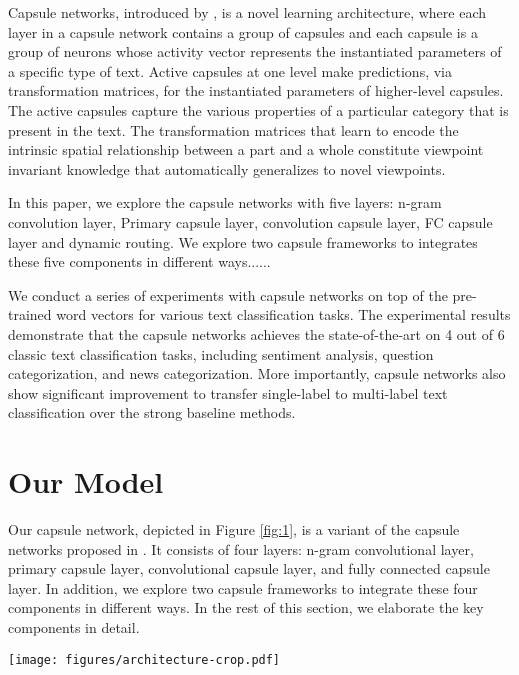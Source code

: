 \documentclass[11pt]{article}
\begin{document}
Capsule networks, introduced by \citet{hinton2011transforming,sabour2017dynamic}, is a novel learning architecture, where each layer in a capsule network contains a group of capsules and each capsule is a group of neurons whose activity vector represents the instantiated parameters of a specific type of text. Active capsules at one level make predictions, via transformation matrices, for the instantiated parameters of higher-level capsules. The active capsules capture the various properties of a particular category that is present in the text. 
The transformation matrices that learn to encode the intrinsic spatial relationship between a part and a whole constitute
viewpoint invariant knowledge that automatically generalizes to novel viewpoints.

In this paper, we explore the capsule networks with five layers:  n-gram convolution layer, Primary capsule layer, convolution capsule layer, FC capsule layer and dynamic routing.
We explore two capsule frameworks to integrates these five components in different ways......


We conduct a series of experiments with capsule networks on top of the pre-trained word vectors for various text classification tasks. 
The experimental results demonstrate that the capsule networks achieves the state-of-the-art on 4 out of 6 classic text classification tasks, including sentiment analysis, question categorization, and news categorization. 
More importantly, capsule networks also show significant improvement to transfer single-label to multi-label text classification over the strong baseline methods. 
\fi
 



\section{Our Model}
Our capsule network, depicted in Figure \ref{fig:1}, is a variant of the capsule networks proposed in . It consists of four layers: n-gram convolutional layer, primary capsule layer, convolutional capsule layer, and fully connected capsule layer. In addition, we explore two capsule frameworks to integrate these four components in different ways.  
In the rest of this section, we elaborate the key components in detail.

\begin{figure*}
\centering
\texttt{[image: figures/architecture-crop.pdf]}
\caption{The Architecture of Capsule network for text classification. The processes of dynamic routing between consecutive layers are shown in the bottom.}
\label{fig:1}
\vspace{-0.5cm}
\end{figure*}
\end{document}
